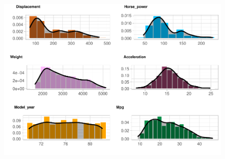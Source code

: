 \begin{figure}[H]\includegraphics[width=.9\linewidth]{img/EDA_files/figure-latex/unnamed-chunk-7-7} \caption{}\end{figure}

\newpage

